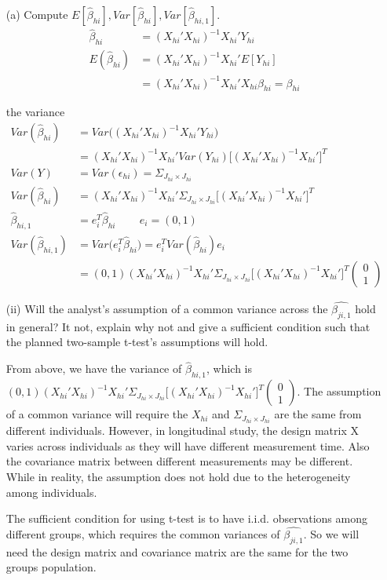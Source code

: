 \documentclass[11pt]{article} %
\begin{document}
\begin{itemize}[]
	
	\item[(a)] Compute $E[\hat{\beta}_{hi} ], Var[\hat{\beta}_{hi} ], Var[\hat{\beta}_{hi,1} ]$. 
\begin{align*}
		\hat{\beta}_{hi} &= (X_{hi}' X_{hi})^{-1} X_{hi}' Y_{hi} \\
	E(\hat{\beta}_{hi}) &= (X_{hi}' X_{hi})^{-1} X_{hi}' E[Y_{hi}] \\
	& =  (X_{hi}' X_{hi})^{-1} X_{hi}' X_{hi} \beta_{hi} =\beta_{hi} 
\end{align*}	

the variance 
\begin{align*}
	Var(\hat{\beta}_{hi}) &= Var \Big((X_{hi}' X_{hi})^{-1} X_{hi}' Y_{hi} \Big) \\
	&= (X_{hi}' X_{hi})^{-1} X_{hi}' Var(Y_{hi}) \Big[ (X_{hi}' X_{hi})^{-1} X_{hi}' \Big]^T \\
	Var(Y) &= Var(\epsilon_{hi})= \Sigma_{J_{hi} \times J_{hi}}\\
	Var(\hat{\beta}_{hi})  & =  (X_{hi}' X_{hi})^{-1} X_{hi}' \Sigma_{J_{hi} \times J_{hi}} \Big[ (X_{hi}' X_{hi})^{-1} X_{hi}' \Big]^T \\
	\hat{\beta}_{hi,1} &= e_i^T \hat{\beta}_{hi} \, \qquad e_i = (0,1)\\
	Var(\hat{\beta}_{hi,1}) &= Var \Big(e_i^T \hat{\beta}_{hi} \Big) = e_i^T  Var(\hat{\beta}_{hi}) e_i\\
&= (0,1) (X_{hi}' X_{hi})^{-1} X_{hi}' \Sigma_{J_{hi} \times J_{hi}} \Big[ (X_{hi}' X_{hi})^{-1} X_{hi}' \Big]^T  \begin{pmatrix}
	0 \\
	1
\end{pmatrix} 
\end{align*}		

\item[(ii)] Will the analyst's assumption of a common variance across the $\hat{\beta_{ji,1}}$ hold in general? It not, explain why not and give a sufficient condition such that the planned two-sample t-test's assumptions will hold.

From above, we have the variance of $\hat{\beta}_{hi,1}$, which is $(0,1) (X_{hi}' X_{hi})^{-1} X_{hi}' \Sigma_{J_{hi} \times J_{hi}} \Big[ (X_{hi}' X_{hi})^{-1} X_{hi}' \Big]^T  \begin{pmatrix}
	0 \\
	1
\end{pmatrix} $. 
The assumption of a common variance will require the $X_{hi}$ and $\Sigma_{J_{hi} \times J_{hi}} $ are the same from different individuals. However, in longitudinal study, the design matrix X varies across individuals as they will have different measurement time. Also the covariance matrix between different measurements may be different. While in reality, the assumption does not hold due to the heterogeneity among individuals.

The sufficient condition for using t-test is to have i.i.d. observations among different groups, which requires the common variances of $\hat{\beta_{ji,1}}$. So we will need the design matrix and covariance matrix are the same for the two groups population. 

\end{itemize}
\end{document}
